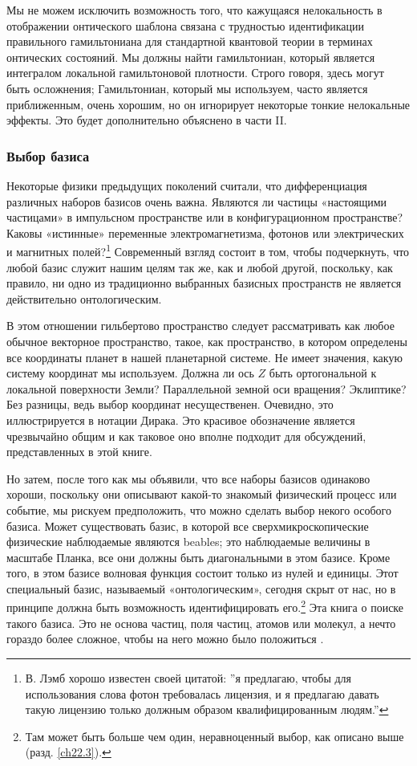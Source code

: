 \documentclass[main.tex]{subfiles}
\begin{document}
Мы не можем исключить возможность того, что кажущаяся нелокальность в отображении онтического шаблона связана с трудностью идентификации правильного гамильтониана для стандартной квантовой теории в терминах онтических состояний. Мы должны найти гамильтониан, который является интегралом локальной гамильтоновой плотности. Строго говоря, здесь могут быть осложнения; Гамильтониан, который мы используем, часто является приближенным, очень хорошим, но он игнорирует некоторые тонкие нелокальные эффекты. Это будет дополнительно объяснено в части II.

\subsubsection{Выбор базиса}\label{ch10.3.2}

Некоторые физики предыдущих поколений считали, что дифференциация различных наборов базисов очень важна. Являются ли частицы «настоящими частицами» в импульсном пространстве или в конфигурационном пространстве? Каковы «истинные» переменные электромагнетизма, фотонов или электрических и магнитных полей?\footnote{В. Лэмб хорошо известен своей цитатой: ''я предлагаю, чтобы для использования слова фотон требовалась лицензия, и я предлагаю давать такую лицензию только должным образом квалифицированным людям.''} Современный взгляд состоит в том, чтобы подчеркнуть, что любой базис служит нашим целям так же, как и любой другой, поскольку, как правило, ни одно из традиционно выбранных базисных пространств не является действительно онтологическим.

В этом отношении гильбертово пространство следует рассматривать как любое обычное векторное пространство, такое, как пространство, в котором определены все координаты планет в нашей планетарной системе. Не имеет значения, какую систему координат мы используем. Должна ли ось $Z$ быть ортогональной к локальной поверхности Земли? Параллельной земной оси вращения? Эклиптике? Без разницы, ведь выбор координат несущественен. Очевидно, это иллюстрируется в нотации Дирака. Это красивое обозначение является чрезвычайно общим и как таковое оно вполне подходит для обсуждений, представленных в этой книге.

Но затем, после того как мы объявили, что все наборы базисов одинаково хороши, поскольку они описывают какой-то знакомый физический процесс или событие, мы рискуем предположить, что можно сделать выбор некого особого базиса. Может существовать базис, в которой все сверхмикроскопические физические наблюдаемые являются beables; это наблюдаемые величины в масштабе Планка, все они должны быть диагональными в этом базисе. Кроме того, в этом базисе волновая функция состоит только из нулей и единицы. Этот специальный базис, называемый «онтологическим», сегодня скрыт от нас, но в принципе должна быть возможность идентифицировать его.\footnote{Там может быть больше чем один, неравноценный выбор, как описано выше (разд. \ref{ch22.3}).} Эта книга о поиске такого базиса. Это не основа частиц, поля частиц, атомов или молекул, а нечто гораздо более сложное, чтобы на него можно было положиться .
\end{document}
